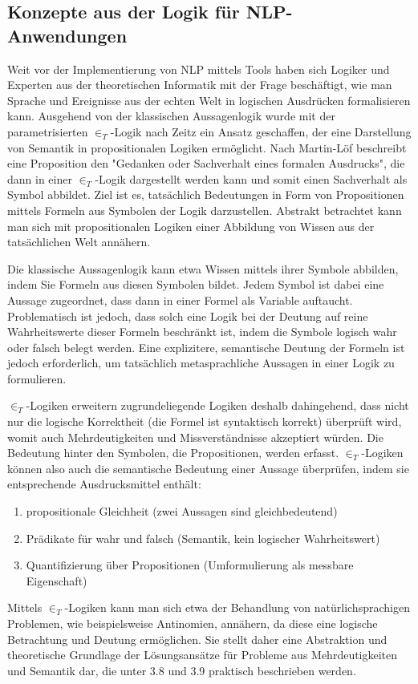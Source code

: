 \documentclass[12pt]{report}
\begin{document}
\subsection{Konzepte aus der Logik für NLP-Anwendungen}
Weit vor der Implementierung von NLP mittels Tools haben sich Logiker und Experten aus der theoretischen Informatik mit der Frage beschäftigt, wie man Sprache und Ereignisse aus der echten Welt in logischen Ausdrücken formalisieren kann. Ausgehend von der klassischen Aussagenlogik wurde mit der parametrisierten $\in_T$-Logik nach Zeitz \cite{ze00} ein Ansatz geschaffen, der eine Darstellung von Semantik in propositionalen Logiken ermöglicht. Nach Martin-Löf \cite{ml96} beschreibt eine Proposition den "Gedanken oder Sachverhalt eines formalen Ausdrucks", die dann in einer $\in_T$-Logik dargestellt werden kann und somit einen Sachverhalt als Symbol abbildet. Ziel ist es, tatsächlich Bedeutungen in Form von Propositionen mittels Formeln aus Symbolen der Logik darzustellen. Abstrakt betrachtet kann man sich mit propositionalen Logiken einer Abbildung von Wissen aus der tatsächlichen Welt annähern. 

Die klassische Aussagenlogik kann etwa Wissen mittels ihrer Symbole abbilden, indem Sie Formeln aus diesen Symbolen bildet. Jedem Symbol ist dabei eine Aussage zugeordnet, dass dann in einer Formel als Variable auftaucht. Problematisch ist jedoch, dass solch eine Logik bei der Deutung auf reine Wahrheitswerte dieser Formeln beschränkt ist, indem die Symbole logisch wahr oder falsch belegt werden. Eine explizitere, semantische Deutung der Formeln ist jedoch erforderlich, um tatsächlich metasprachliche Aussagen in einer Logik zu formulieren. 

$\in_T$-Logiken erweitern zugrundeliegende Logiken deshalb dahingehend, dass nicht nur die logische Korrektheit (die Formel ist syntaktisch korrekt) überprüft wird, womit auch Mehrdeutigkeiten und Missverständnisse akzeptiert würden. Die Bedeutung hinter den Symbolen, die Propositionen, werden erfasst. $\in_T$-Logiken können also auch die semantische Bedeutung einer Aussage überprüfen, indem sie entsprechende Ausdrucksmittel enthält:
\begin{enumerate}
\item propositionale Gleichheit (zwei Aussagen sind gleichbedeutend)
\item Prädikate für wahr und falsch (Semantik, kein logischer Wahrheitswert)
\item Quantifizierung über Propositionen (Umformulierung als messbare Eigenschaft)
\end{enumerate}
Mittels $\in_T$-Logiken kann man sich etwa der Behandlung von natürlichsprachigen Problemen, wie beispielsweise Antinomien, annähern, da diese eine logische Betrachtung und Deutung ermöglichen. Sie stellt daher eine Abstraktion und theoretische Grundlage der Lösungsansätze für Probleme aus Mehrdeutigkeiten und Semantik dar, die unter 3.8 und 3.9 praktisch beschrieben werden.
\end{document}
